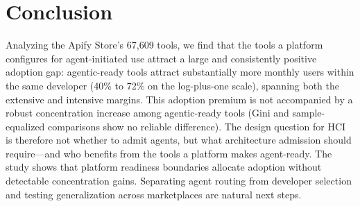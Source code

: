 \section{Conclusion}
\label{sec:conclusion}

Analyzing the Apify Store's 67{,}609 tools, we find that the tools a platform
configures for agent-initiated use attract a large and consistently positive
adoption gap: agentic-ready tools attract substantially more monthly users
within the same developer (40\% to 72\% on the log-plus-one scale), spanning both the extensive and
intensive margins.
This adoption premium is not accompanied by a robust concentration increase
among agentic-ready tools (Gini and sample-equalized comparisons show no
reliable difference). The design question for HCI is
therefore not whether to
admit agents, but what architecture admission should require---and who benefits
from the tools a platform makes agent-ready. The study shows that platform readiness boundaries allocate adoption without detectable concentration gains.
Separating agent routing from developer selection and testing generalization across marketplaces are natural next steps.
